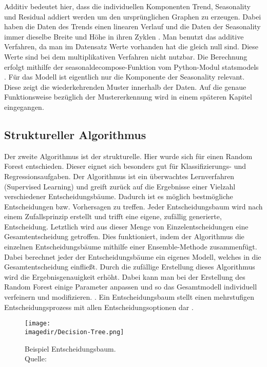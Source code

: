 Additiv bedeutet hier, dass die individuellen Komponenten Trend, Seasonality und Residual addiert werden um den ursprünglichen Graphen zu erzeugen. Dabei haben die Daten des Trends einen linearen Verlauf und die Daten der Seasonality immer dieselbe Breite und Höhe in ihren Zyklen . Man benutzt das additive Verfahren, da man im Datensatz Werte vorhanden hat die gleich null sind. Diese Werte sind bei dem multiplikativen Verfahren nicht nutzbar. Die Berechnung erfolgt mithilfe der seasonal\textunderscore decompose-Funktion vom Python-Modul statsmodels \autocite[Vgl.][]{Radecic.15.7.2021}. Für das Modell ist eigentlich nur die Komponente der Seasonality relevant. Diese zeigt die wiederkehrenden Muster innerhalb der Daten. Auf die genaue Funktionsweise bezüglich der Mustererkennung wird in einem späteren Kapitel eingegangen.



\subsection{Struktureller Algorithmus}

Der zweite Algorithmus ist der strukturelle. Hier wurde sich für einen Random Forest entschieden. Dieser eignet sich besonders gut für Klassifizierungs- und Regressionsaufgaben. Der Algorithmus ist ein überwachtes Lernverfahren (Supervised Learning) und greift zurück auf die Ergebnisse einer Vielzahl verschiedener Entscheidungsbäume. Dadurch ist es möglich bestmögliche Entscheidungen bzw. Vorhersagen zu treffen. Jeder Entscheidungsbaum wird nach einem Zufallsprinzip erstellt und trifft eine eigene, zufällig generierte, Entscheidung. Letztlich wird aus dieser Menge von Einzelentscheidungen eine Gesamtentscheidung getroffen. Dies funktioniert, indem der Algorithmus die einzelnen Entscheidungsbäume mithilfe einer Ensemble-Methode zusammenfügt. Dabei berechnet jeder der Entscheidungsbäume ein eigenes Modell, welches in die Gesamtentscheidung einfließt. Durch die zufällige Erstellung dieses Algorithmus wird die Ergebnisgenauigkeit erhöht. Dabei kann man bei der Erstellung des Random Forest einige Parameter anpassen und so das Gesamtmodell individuell verfeinern und modifizieren. \autocite[Vgl.][]{Luber.17.3.2020}. Ein Entscheidungsbaum stellt einen mehrstufigen Entscheidungsprozess mit allen Entscheidungsoptionen dar \autocite{t2informatik.WirentwickelnSoftware..06062018}.

\begin{figure}[H]
	
	\centering
	\texttt{[image: \\imagedir/Decision-Tree.png]}
	\captionsetup{format=hang}
	\caption[Beispiel Entscheidungsbaum]{\label{fig:test}Beispiel Entscheidungsbaum. \\Quelle: 
		\cite{.06112021}}
	
\end{figure}

